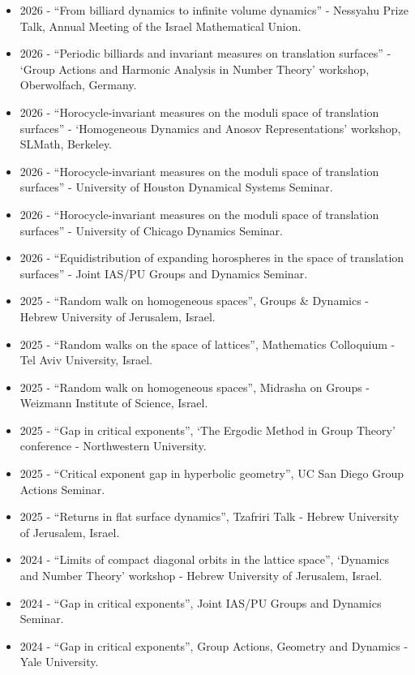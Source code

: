 \begin{itemize}
\tightlist
\item
  2026 - ``From billiard dynamics to infinite volume dynamics'' - Nessyahu Prize Talk,
  Annual Meeting of the Israel Mathematical Union.
\item 
  2026 - ``Periodic billiards and invariant measures on translation surfaces'' -
  `Group Actions and Harmonic Analysis in Number Theory' workshop, Oberwolfach, Germany.
\item
  2026 - ``Horocycle-invariant measures on the moduli space of
  translation surfaces'' - `Homogeneous Dynamics and Anosov
  Representations' workshop, SLMath, Berkeley.
\item
  2026 - ``Horocycle-invariant measures on the moduli space of
  translation surfaces'' - University of Houston Dynamical Systems
  Seminar.
\item
  2026 - ``Horocycle-invariant measures on the moduli space of
  translation surfaces'' - University of Chicago Dynamics Seminar.
\item
  2026 - ``Equidistribution of expanding horospheres in the space of
  translation surfaces'' - Joint IAS/PU Groups and Dynamics Seminar.
\item
  2025 - ``Random walk on homogeneous spaces'', Groups \& Dynamics -
  Hebrew University of Jerusalem, Israel.
\item
  2025 - ``Random walks on the space of lattices'', Mathematics
  Colloquium - Tel Aviv University, Israel.
\item
  2025 - ``Random walk on homogeneous spaces'', Midrasha on Groups -
  Weizmann Institute of Science, Israel.
\item
  2025 - ``Gap in critical exponents'', `The Ergodic Method in Group
  Theory' conference - Northwestern University.
\item
  2025 - ``Critical exponent gap in hyperbolic geometry'', UC San Diego
  Group Actions Seminar.
\item
  2025 - ``Returns in flat surface dynamics'', Tzafriri Talk - Hebrew
  University of Jerusalem, Israel.
\item
  2024 - ``Limits of compact diagonal orbits in the lattice space'',
  `Dynamics and Number Theory' workshop - Hebrew University of
  Jerusalem, Israel.
\item
  2024 - ``Gap in critical exponents'', Joint IAS/PU Groups and Dynamics
  Seminar.
\item
  2024 - ``Gap in critical exponents'', Group Actions, Geometry and
  Dynamics - Yale University.

\end{itemize}
